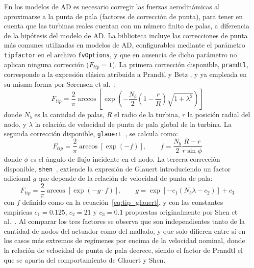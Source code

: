 En los modelos de AD es necesario corregir las fuerzas aerodinámicas al aproximarse a la punta de pala (factores de corrección de punta), para tener en cuenta que las turbinas reales cuentan con un número finito de palas, a diferencia de la hipótesis del modelo de AD. La biblioteca incluye las correcciones de punta más comunes utilizadas en modelos de AD, configurables mediante el parámetro \texttt{tipfactor} en el archivo \texttt{fvOptions}, y que en ausencia de dicho parámetro no aplican ninguna corrección ($F_{tip}=1$). La primera corrección disponible, \texttt{prandtl}, corresponde a la expresión clásica atribuida a Prandtl y Betz \citep{betz1919}, y ya empleada en su misma forma por Sørensen et al.~\citep{sorensen2020}:
\begin{equation}
F_{tip} = \frac{2}{\pi} \arccos\left[\exp\left(-\frac{N_b}{2}\left(1-\frac{r}{R}\right)\sqrt{1+\lambda^2}\right)\right]
\label{eq:tip_prandtl}
\end{equation}
donde $N_b$ es la cantidad de palas, $R$ el radio de la turbina, $r$ la posición radial del nodo, y $\lambda$ la relación de velocidad de punta de pala global de la turbina.
La segunda corrección disponible, \texttt{glauert}~\citep{glauert1935}, se calcula como:
\begin{equation}
F_{tip} = \frac{2}{\pi} \arccos\left[\exp(-f)\right], \qquad f = \frac{N_b}{2}\frac{R-r}{r \sin\phi}
\label{eq:tip_glauert}
\end{equation}
donde $\phi$ es el ángulo de flujo incidente en el nodo.
La tercera corrección disponible, \texttt{shen}~\citep{shen2005}, extiende la expresión de Glauert introduciendo un factor adicional $g$ que depende de la relación de velocidad de punta de pala:
\begin{equation}
F_{tip} = \frac{2}{\pi} \arccos\left[\exp(-g \cdot f)\right], \qquad g = \exp\left[-c_1\left(N_b \lambda - c_2\right)\right] + c_3
\label{eq:tip_shen}
\end{equation}
con $f$ definido como en la ecuación~\ref{eq:tip_glauert}, y con las constantes empíricas $c_1=0.125$, $c_2=21$ y $c_3=0.1$ propuestas originalmente por Shen et al.~\citep{shen2005}.
Al comparar los tres factores se observa que son independientes tanto de la cantidad de nodos del actuador como del mallado, y que solo difieren entre sí en los casos más extremos de regímenes por encima de la velocidad nominal, donde la relación de velocidad de punta de pala decrece, siendo el factor de Prandtl el que se aparta del comportamiento de Glauert y Shen.
